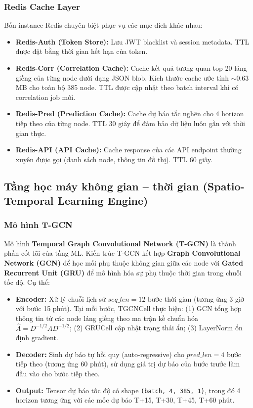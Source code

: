 \subsubsection{Redis Cache Layer}
Bốn instance Redis chuyên biệt phục vụ các mục đích khác nhau:
\begin{itemize}
    \item \textbf{Redis-Auth (Token Store):} Lưu JWT blacklist và session metadata. TTL được đặt bằng thời gian hết hạn của token.
    \item \textbf{Redis-Corr (Correlation Cache):} Cache kết quả tương quan top-20 láng giềng của từng node dưới dạng JSON blob. Kích thước cache ước tính $\sim$0.63 MB cho toàn bộ 385 node. TTL được cập nhật theo batch interval khi có correlation job mới.
    \item \textbf{Redis-Pred (Prediction Cache):} Cache dự báo tắc nghẽn cho 4 horizon tiếp theo của từng node. TTL 30 giây để đảm bảo dữ liệu luôn gần với thời gian thực.
    \item \textbf{Redis-API (API Cache):} Cache response của các API endpoint thường xuyên được gọi (danh sách node, thông tin đồ thị). TTL 60 giây.
\end{itemize}

\subsection{Tầng học máy không gian -- thời gian (Spatio-Temporal Learning Engine)}

\subsubsection{Mô hình T-GCN}
Mô hình \textbf{Temporal Graph Convolutional Network (T-GCN)} là thành phần cốt lõi của tầng ML. Kiến trúc T-GCN kết hợp \textbf{Graph Convolutional Network (GCN)} để học mối phụ thuộc không gian giữa các node với \textbf{Gated Recurrent Unit (GRU)} để mô hình hóa sự phụ thuộc thời gian trong chuỗi tốc độ. Cụ thể:

\begin{itemize}
    \item \textbf{Encoder:} Xử lý chuỗi lịch sử $seq\_len = 12$ bước thời gian (tương ứng 3 giờ với bước 15 phút). Tại mỗi bước, TGCNCell thực hiện: (1) GCN tổng hợp thông tin từ các node láng giềng theo ma trận kề chuẩn hóa $\hat{A} = D^{-1/2}AD^{-1/2}$; (2) GRUCell cập nhật trạng thái ẩn; (3) LayerNorm ổn định gradient.
    \item \textbf{Decoder:} Sinh dự báo tự hồi quy (auto-regressive) cho $pred\_len = 4$ bước tiếp theo (tương ứng 60 phút), sử dụng giá trị dự báo của bước trước làm đầu vào cho bước tiếp theo.
    \item \textbf{Output:} Tensor dự báo tốc độ có shape \texttt{(batch, 4, 385, 1)}, trong đó 4 horizon tương ứng với các mốc dự báo T+15, T+30, T+45, T+60 phút.
\end{itemize}


